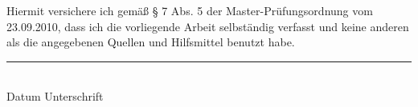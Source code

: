 \pagestyle{erklaerung}

Hiermit versichere ich gemäß § 7 Abs. 5 der Master-Prüfungsordnung vom 23.09.2010, dass ich die vorliegende Arbeit selbständig verfasst und keine anderen als die angegebenen Quellen und Hilfsmittel benutzt habe.

\vspace{2.5cm}
\rule[0.25cm]{12cm}{1pt} \\
Datum \hspace{3cm} Unterschrift

